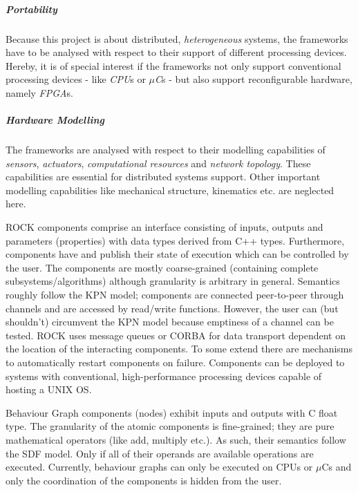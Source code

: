 \documentclass[a4paper,twocolumn]{esapub2005} %
\begin{document}
\subparagraph{Portability}
Because this project is about distributed, \emph{heterogeneous} systems, the frameworks have to be analysed with respect to their support of different processing devices.
Hereby, it is of special interest if the frameworks not only support conventional processing devices - like \emph{CPU}s or \emph{$\mu$C}s - but also support reconfigurable hardware, namely \emph{FPGA}s.

\subparagraph{Hardware Modelling}
The frameworks are analysed with respect to their modelling capabilities of \emph{sensors}, \emph{actuators}, \emph{computational resources} and \emph{network topology}.
These capabilities are essential for distributed systems support.
Other important modelling capabilities like mechanical structure, kinematics etc. are neglected here.

ROCK components comprise an interface consisting of inputs, outputs and parameters (properties) with data types derived from C++ types.
Furthermore, components have and publish their state of execution which can be controlled by the user.
The components are mostly coarse-grained (containing complete subsystems/algorithms) although granularity is arbitrary in general.
Semantics roughly follow the KPN model; components are connected peer-to-peer through channels and are accessed by read/write functions.
However, the user can (but shouldn't) circumvent the KPN model because emptiness of a channel can be tested.
ROCK uses message queues or CORBA for data transport dependent on the location of the interacting components.
To some extend there are mechanisms to automatically restart components on failure.
Components can be deployed to systems with conventional, high-performance processing devices capable of hosting a UNIX OS.

Behaviour Graph components (nodes) exhibit inputs and outputs with C float type.
The granularity of the atomic components is fine-grained; they are pure mathematical operators (like add, multiply etc.).
As such, their semantics follow the SDF model.
Only if all of their operands are available operations are executed.
Currently, behaviour graphs can only be executed on CPUs or $\mu$Cs and only the coordination of the components is hidden from the user.
\end{document}
